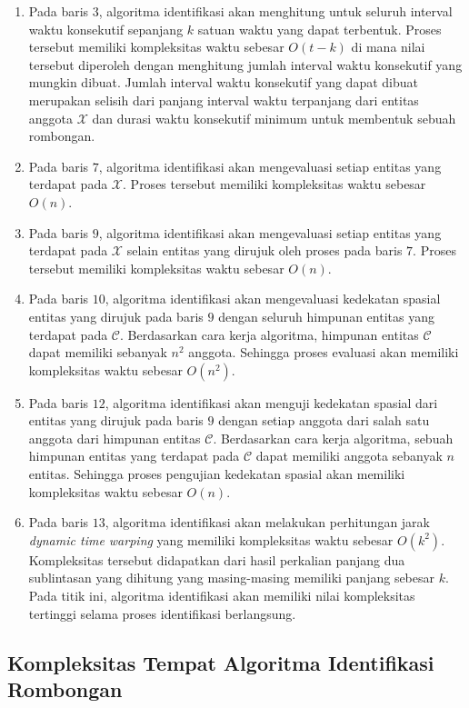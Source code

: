 \begin{enumerate}
    \item Pada baris $3$, algoritma identifikasi akan menghitung untuk seluruh interval waktu konsekutif sepanjang $k$ satuan waktu yang dapat terbentuk. Proses tersebut memiliki kompleksitas waktu sebesar $O(t - k)$ di mana nilai tersebut diperoleh dengan menghitung jumlah interval waktu konsekutif yang mungkin dibuat. Jumlah interval waktu konsekutif yang dapat dibuat merupakan selisih dari panjang interval waktu terpanjang dari entitas anggota $\mathcal{X}$ dan durasi waktu konsekutif minimum untuk membentuk sebuah rombongan.
    \item Pada baris $7$, algoritma identifikasi akan mengevaluasi setiap entitas yang terdapat pada $\mathcal{X}$. Proses tersebut memiliki kompleksitas waktu sebesar $O(n)$.
    \item Pada baris $9$, algoritma identifikasi akan mengevaluasi setiap entitas yang terdapat pada $\mathcal{X}$ selain entitas yang dirujuk oleh proses pada baris $7$. Proses tersebut memiliki kompleksitas waktu sebesar $O(n)$.
    \item Pada baris $10$, algoritma identifikasi akan mengevaluasi kedekatan spasial entitas yang dirujuk pada baris $9$ dengan seluruh himpunan entitas yang terdapat pada $\mathcal{C}$. Berdasarkan cara kerja algoritma, himpunan entitas $\mathcal{C}$ dapat memiliki sebanyak $n^2$ anggota. Sehingga proses evaluasi akan memiliki kompleksitas waktu sebesar $O(n^2)$.
    \item Pada baris $12$, algoritma identifikasi akan menguji kedekatan spasial dari entitas yang dirujuk pada baris $9$ dengan setiap anggota dari salah satu anggota dari himpunan entitas $\mathcal{C}$. Berdasarkan cara kerja algoritma, sebuah himpunan entitas yang terdapat pada $\mathcal{C}$ dapat memiliki anggota sebanyak $n$ entitas. Sehingga proses pengujian kedekatan spasial akan memiliki kompleksitas waktu sebesar $O(n)$.
    \item Pada baris $13$, algoritma identifikasi akan melakukan perhitungan jarak \textit{dynamic time warping} yang memiliki kompleksitas waktu sebesar $O(k^2)$. Kompleksitas tersebut didapatkan dari hasil perkalian panjang dua sublintasan yang dihitung yang masing-masing memiliki panjang sebesar $k$. Pada titik ini, algoritma identifikasi akan memiliki nilai kompleksitas tertinggi selama proses identifikasi berlangsung.
\end{enumerate}

\subsection{Kompleksitas Tempat Algoritma Identifikasi Rombongan}
\label{subsubsec:space-complexity}

